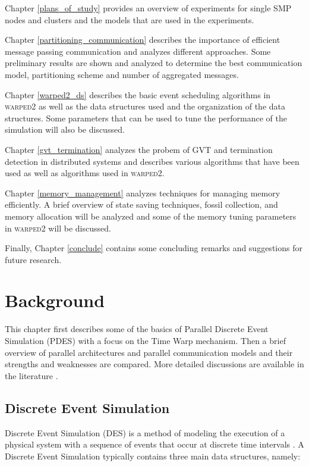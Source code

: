 \documentclass[11pt]{book}
\begin{document}
Chapter \ref{plans_of_study} provides an overview of experiments for single SMP nodes and
clusters and the models that are used in the experiments.

Chapter \ref{partitioning_communication} describes the importance of efficient message
passing communication and analyzes different approaches.  Some preliminary results are
shown and analyzed to determine the best communication model, partitioning scheme and
number of aggregated messages.

Chapter \ref{warped2_ds} describes the basic event scheduling algorithms in
\textsc{warped2} as well as the data structures used and the organization of the data
structures.  Some parameters that can be used to tune the performance of the simulation
will also be discussed.

Chapter \ref{gvt_termination} analyzes the probem of GVT and termination detection in
distributed systems and describes various algorithms that have been used as well as
algorithms used in \textsc{warped2}.

Chapter \ref{memory_management} analyzes techniques for managing memory efficiently.  A
brief overview of state saving techniques, fossil collection, and memory allocation will
be analyzed and some of the memory tuning parameters in \textsc{warped2} will be
discussed.

Finally, Chapter \ref{conclude} contains some concluding remarks and suggestions for
future research.


\chapter{Background}\label{background}

This chapter first describes some of the basics of Parallel Discrete Event Simulation (PDES) with a
focus on the Time Warp mechanism.  Then a brief overview of parallel architectures and parallel
communication models and their strengths and weaknesses are compared.  More detailed discussions are
available in the literature \cite{fujimoto-90,fujimoto-00}.

\section{Discrete Event Simulation}

Discrete Event Simulation (DES) is a method of modeling the execution of a physical system with a
sequence of events that occur at discrete time intervals \cite{law-00}.  A Discrete Event Simulation
typically contains three main data structures, namely:
\end{document}

